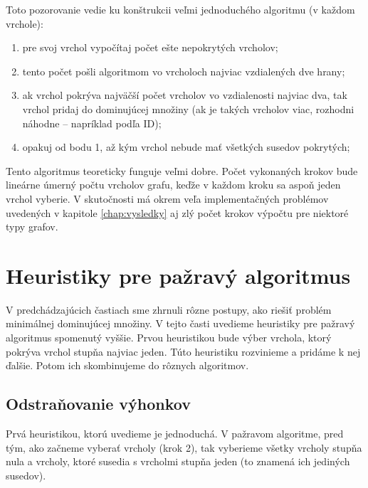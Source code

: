 Toto pozorovanie vedie ku konštrukcii veľmi jednoduchého algoritmu (v každom 
vrchole):

\begin{enumerate}
	\item pre svoj vrchol vypočítaj počet ešte nepokrytých vrcholov;
	\item tento počet pošli algoritmom vo vrcholoch najviac vzdialených dve 
		hrany;
	\item ak vrchol pokrýva najväčší počet vrcholov vo vzdialenosti najviac 
		dva, tak vrchol pridaj do dominujúcej množiny (ak je takých vrcholov 
		viac, rozhodni náhodne -- napríklad podľa ID);
	\item opakuj od bodu 1, až kým vrchol nebude mať všetkých susedov 
		pokrytých;
\end{enumerate}

Tento algoritmus teoreticky funguje veľmi dobre. Počet vykonaných krokov bude 
lineárne úmerný počtu vrcholov grafu, keďže v každom kroku sa aspoň jeden 
vrchol vyberie. V skutočnosti má okrem veľa implementačných problémov uvedených 
v kapitole \ref{chap:vysledky} aj zlý počet krokov výpočtu pre niektoré typy 
grafov.


\section{Heuristiky pre pažravý algoritmus}

V predchádzajúcich častiach sme zhrnuli rôzne postupy, ako riešiť problém 
minimálnej dominujúcej množiny. V tejto časti uvedieme heuristiky pre pažravý 
algoritmus spomenutý vyššie. Prvou heuristikou bude výber vrchola, ktorý 
pokrýva vrchol stupňa najviac jeden. Túto heuristiku rozvinieme a pridáme k 
nej ďalšie. Potom ich skombinujeme do rôznych algoritmov.

\subsection{Odstraňovanie výhonkov}

Prvá heuristikou, ktorú uvedieme je jednoduchá. V pažravom algoritme, pred tým, 
ako začneme vyberať vrcholy (krok 2), tak vyberieme všetky vrcholy stupňa nula 
a vrcholy, ktoré susedia s vrcholmi stupňa jeden (to znamená ich jediných 
susedov).